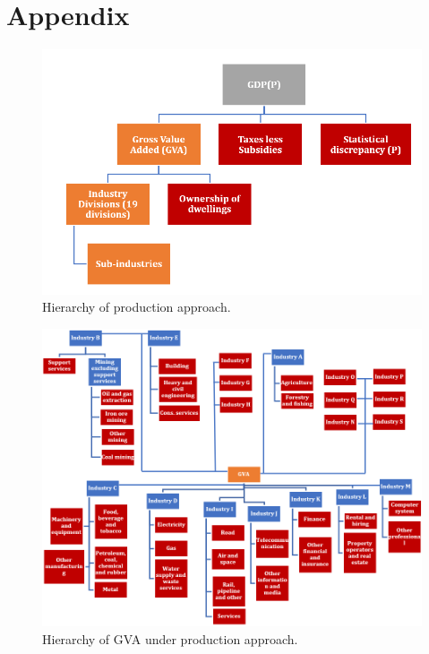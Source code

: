 \documentclass[graybox]{svmult}
\begin{document}
\pagebreak



\section*{Appendix}

\begin{figure}[H]
	\centering
	\small
	\includegraphics[scale=0.65]{Figs/GDP_P_fig1.PNG}
	\caption{Hierarchy of production approach.}\label{GDP_P_fig1}
\end{figure}

\begin{figure}[H]
	\centering
	\small
	\includegraphics[scale=0.65]{Figs/GDP_P_fig2.PNG}
	\caption{Hierarchy of GVA under production approach.}\label{GDP_P_fig2}
\end{figure}
\end{document}
